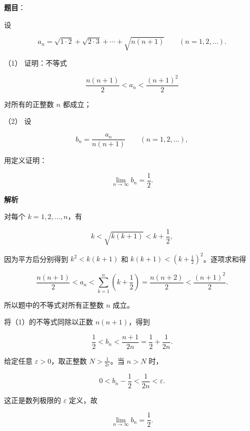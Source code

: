 \begin{answer}

\textbf{题目}：

设

\nopagebreak[4]
\[
a_n=\sqrt{1\cdot2}+\sqrt{2\cdot3}+\cdots+\sqrt{n(n+1)}
\qquad(n=1,2,\ldots).
\]

（1） 证明：不等式

\nopagebreak[4]
\[
\frac{n(n+1)}2<a_n<\frac{(n+1)^2}{2}
\]

对所有的正整数 $n$ 都成立；

（2） 设

\nopagebreak[4]
\[
b_n=\frac{a_n}{n(n+1)}
\qquad(n=1,2,\ldots),
\]

用定义证明：

\nopagebreak[4]
\[
\lim_{n\to\infty}b_n=\frac12.
\]

\textbf{解析}


对每个 $k=1,2,\ldots,n$，有

\nopagebreak[4]
\[
k<\sqrt{k(k+1)}<k+\frac12,
\]

因为平方后分别得到 $k^2<k(k+1)$ 和
$k(k+1)<(k+\frac12)^2$。逐项求和得

\nopagebreak[4]
\[
\frac{n(n+1)}2<a_n
<\sum_{k=1}^n\left(k+\frac12\right)
=\frac{n(n+2)}2
<\frac{(n+1)^2}{2}.
\]

所以题中的不等式对所有正整数 $n$ 成立。


将（1）的不等式同除以正数 $n(n+1)$，得到

\nopagebreak[4]
\[
\frac12<
b_n
<\frac{n+1}{2n}
=\frac12+\frac1{2n}.
\]

给定任意 $\varepsilon>0$，取正整数
$N>\frac1{2\varepsilon}$。当 $n>N$ 时，

\nopagebreak[4]
\[
0<b_n-\frac12<\frac1{2n}<\varepsilon.
\]

这正是数列极限的 $\varepsilon$ 定义，故

\nopagebreak[4]
\[
\lim_{n\to\infty}b_n=\frac12.
\]



\end{answer}
